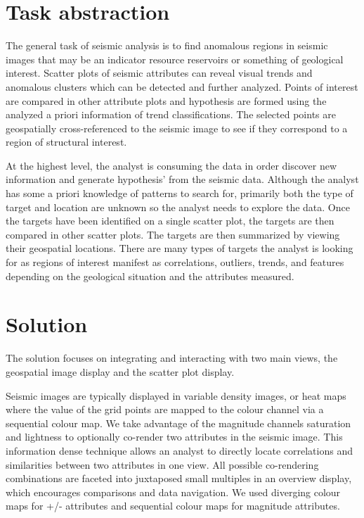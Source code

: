 \documentclass[journal]{vgtc}                %
\begin{document}
\section{Task abstraction}
The general task of seismic analysis is to find anomalous regions in seismic images
that may be an indicator resource reservoirs or something of geological interest.
Scatter plots of seismic attributes can reveal visual trends and anomalous clusters
which can be detected and further analyzed. Points of interest are compared in other attribute plots
and hypothesis are formed using the analyzed a priori information of trend classifications.
The selected points  are geospatially cross-referenced to the seismic image to see if
they correspond to a region of structural interest.

At the highest level, the analyst is consuming the data in order discover new information
and generate  hypothesis' from the seismic data. Although the analyst has some a priori
knowledge of patterns to search for, primarily both the type of target and location are unknown
so the analyst needs to explore the data. Once the targets have been identified on
a single scatter plot, the targets are then compared in other scatter plots. The targets
are then summarized by viewing their geospatial locations. There are many types of
targets the analyst is looking for as regions of interest manifest as correlations, outliers, trends, and
features depending on the geological situation and the attributes measured.

\section{Solution}
The solution focuses on integrating and interacting with two main views,
the geospatial image display and the scatter plot display.

Seismic images are typically displayed in variable density images, or heat maps where
the value of the grid points are mapped to the colour channel via a sequential colour map. We take
advantage of the magnitude channels saturation and lightness to optionally co-render two attributes
in the seismic image. This information dense technique allows an analyst to directly locate
correlations and similarities between two attributes in one view. All possible co-rendering combinations
are faceted into juxtaposed small multiples in an overview display, which encourages comparisons and
data navigation. We used diverging colour maps for +/- attributes and sequential colour maps for
magnitude attributes.
\end{document}
